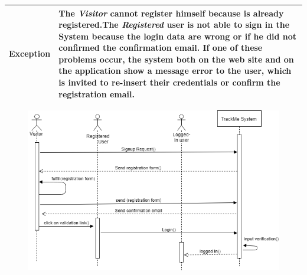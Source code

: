 \begin{table}[H]
\begin{tabular}{|p{3.5cm}|p{10.3cm}|}
    \hline
    \textbf{\large{Exception}} 			& The \emph{Visitor} cannot register himself because is already registered.\newline The \emph{Registered} user                                         is not able to sign in the System because the login data are wrong or if he did not confirmed  the confirmation email. \newline
    										If one of these problems occur, the system both on the web site and on the application show a message error to the user, which is invited to re-insert their credentials or confirm the registration email.\\
    
    \hline
    
    
    \end{tabular}
	
\end{table}
\begin{figure}[H]
    \centering
    \includegraphics[scale=0.4]{rasdL/Pictures/login1.png}
\end{figure}

